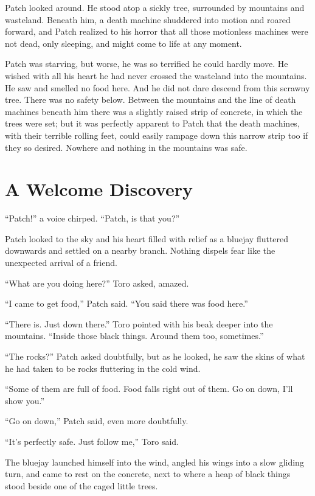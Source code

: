 \documentclass[ebook,oneside,openany,12pt]{memoir}
\begin{document}
Patch looked around. He stood atop a sickly tree, surrounded by
mountains and wasteland. Beneath him, a death machine shuddered into
motion and roared forward, and Patch realized to his horror that all
those motionless machines were not dead, only sleeping, and might come
to life at any moment.

Patch was starving, but worse, he was so terrified he could hardly
move. He wished with all his heart he had never crossed the wasteland
into the mountains. He saw and smelled no food here. And he did not
dare descend from this scrawny tree. There was no safety
below. Between the mountains and the line of death machines beneath
him there was a slightly raised strip of concrete, in which the trees
were set; but it was perfectly apparent to Patch that the death
machines, with their terrible rolling feet, could easily rampage down
this narrow strip too if they so desired. Nowhere and nothing in the
mountains was safe.


\section{A Welcome Discovery}

“Patch!” a voice chirped. “Patch, is that you?”

Patch looked to the sky and his heart filled with relief as a bluejay
fluttered downwards and settled on a nearby branch. Nothing dispels
fear like the unexpected arrival of a friend.

“What are you doing here?” Toro asked, amazed.

“I came to get food,” Patch said. “You said there was food here.”

“There is. Just down there.” Toro pointed with his beak deeper into
the mountains. “Inside those black things. Around them too,
sometimes.”

“The rocks?” Patch asked doubtfully, but as he looked, he saw the
skins of what he had taken to be rocks fluttering in the cold wind.

“Some of them are full of food. Food falls right out of them. Go on
down, I’ll show you.”

“Go on down,” Patch said, even more doubtfully.

“It’s perfectly safe. Just follow me,” Toro said.

The bluejay launched himself into the wind, angled his wings into a
slow gliding turn, and came to rest on the concrete, next to where a
heap of black things stood beside one of the caged little trees.
\end{document}
